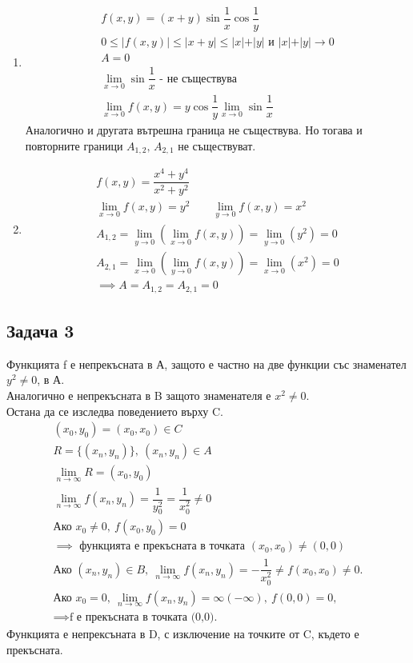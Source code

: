 \documentclass[a4paper,fleqn,12pt]{article}
\theoremstyle{definition}
\begin{document}
\begin{enumerate}
\item 
\begin{gather*}
f(x,y) = (x+y) \sin{\dfrac{1}{x}} \cos{\dfrac{1}{y}}\\
0 \leq \vert f(x,y) \vert \leq \vert x + y \vert \leq  \vert x \vert + \vert y \vert \text{ и } \vert x \vert + \vert y \vert \to 0 \\
A = 0 \\
\lim\limits_{x \to 0} \sin{\dfrac{1}{x}} \text{ - не съществува} \\
\lim\limits_{x \to 0} f(x,y) = y\cos{\dfrac{1}{y}} \lim\limits_{x \to 0} \sin{\dfrac{1}{x}}
\end{gather*}
Аналогично и другата вътрешна граница не съществува. Но тогава и повторните граници $A_{1,2},\, A_{2,1}$ не съществуват.

\item
\begin{gather*}
f(x,y) = \dfrac{x^4 + y^4}{x^2 + y^2}\\
\lim\limits_{x \to 0} f(x,y) = y^2 \qquad 
\lim\limits_{y \to 0} f(x,y) = x^2 \\
A_{1,2} = \lim\limits_{y \to 0} \left( \lim\limits_{x \to 0} f(x,y) \right) = \lim\limits_{y \to 0} \left( y^2 \right) = 0\\
A_{2,1} = \lim\limits_{x \to 0} \left( \lim\limits_{y \to 0} f(x,y) \right) = \lim\limits_{x \to 0} \left( x^2 \right) = 0 \\
\implies A = A_{1,2} = A_{2,1} = 0
\end{gather*}
\end{enumerate}

\subsection*{Задача 3}
Функцията f е непрекъсната в А, защото е частно на две функции със знаменател $y^2\neq 0$, в А.\\
Аналогично е непрекъсната в B защото знаменателя е $x^2 \neq 0$.\\
Остана да се изследва поведението върху C. \\
\begin{gather*}
(x_0,y_0) = (x_0, x_0) \in C \\
R = \{ (x_n , y_n) \},\ (x_n , y_n) \in A \\
\lim\limits_{n \to \infty} R = (x_0, y_0)\\
\lim\limits_{n \to \infty} f(x_n,y_n) = \dfrac{1}{y_0 ^2} = \dfrac{1}{x_0 ^2} \neq 0\\
\text{Ако } x_0 \neq 0, \ f(x_0,y_0) = 0 \\
\implies \text{ функцията е прекъсната в точката } (x_0, x_0) \neq (0,0) \\
\text{Ако } (x_n , y_n) \in B,\ \lim\limits_{n \to \infty} f(x_n,y_n) = - \dfrac{1}{x_0 ^2} \neq f(x_0, x_0) \neq 0. \\
\text{Ако } x_0 = 0,\ \lim\limits_{n \to \infty} f(x_n,y_n) = \infty(-\infty),\ f(0,0) = 0,\\
\implies \text{f е прекъсната в точката (0,0).} 
\end{gather*}
Функцията е непрексъната в D, с изключение на точките от C, където е прекъсната. 
\end{document}
